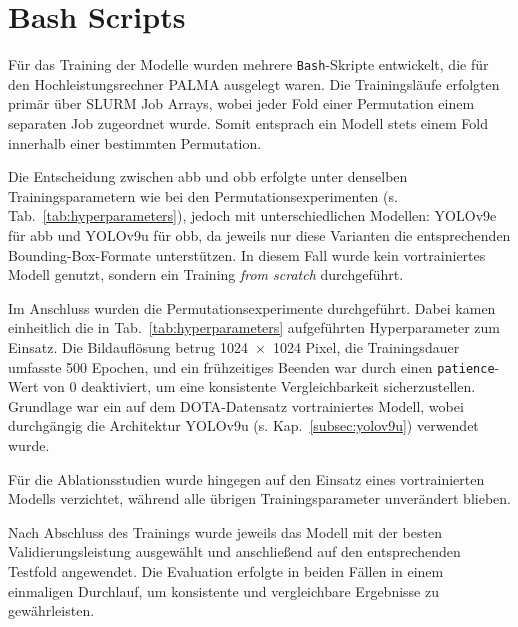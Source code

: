 \section{Bash Scripts}

Für das Training der Modelle wurden mehrere \texttt{Bash}-Skripte entwickelt, die für den Hochleistungsrechner \acrshort{PALMA} ausgelegt waren. Die Trainingsläufe erfolgten primär über \acrshort{SLURM} Job Arrays, wobei jeder Fold einer Permutation einem separaten Job zugeordnet wurde. Somit entsprach ein Modell stets einem Fold innerhalb einer bestimmten Permutation.  

Die Entscheidung zwischen \acrlong{abb} und \acrlong{obb} erfolgte unter denselben Trainingsparametern wie bei den Permutationsexperimenten (s. Tab.~\ref{tab:hyperparameters}), jedoch mit unterschiedlichen Modellen: \acrshort{YOLO}v9e für \acrshort{abb} und \acrshort{YOLO}v9u für \acrshort{obb}, da jeweils nur diese Varianten die entsprechenden Bounding-Box-Formate unterstützen. In diesem Fall wurde kein vortrainiertes Modell genutzt, sondern ein Training \textit{from scratch} durchgeführt.  

Im Anschluss wurden die Permutationsexperimente durchgeführt. Dabei kamen einheitlich die in Tab.~\ref{tab:hyperparameters} aufgeführten Hyperparameter zum Einsatz. Die Bildauflösung betrug 1024~$\times$~1024 Pixel, die Trainingsdauer umfasste 500 Epochen, und ein frühzeitiges Beenden war durch einen \texttt{patience}-Wert von 0 deaktiviert, um eine konsistente Vergleichbarkeit sicherzustellen. Grundlage war ein auf dem \acrshort{DOTA}-Datensatz vortrainiertes Modell, wobei durchgängig die Architektur \acrshort{YOLO}v9u (s. Kap.~\ref{subsec:yolov9u}) verwendet wurde.  

Für die Ablationsstudien wurde hingegen auf den Einsatz eines vortrainierten Modells verzichtet, während alle übrigen Trainingsparameter unverändert blieben.  

Nach Abschluss des Trainings wurde jeweils das Modell mit der besten Validierungsleistung ausgewählt und anschließend auf den entsprechenden Testfold angewendet. Die Evaluation erfolgte in beiden Fällen in einem einmaligen Durchlauf, um konsistente und vergleichbare Ergebnisse zu gewährleisten.  



